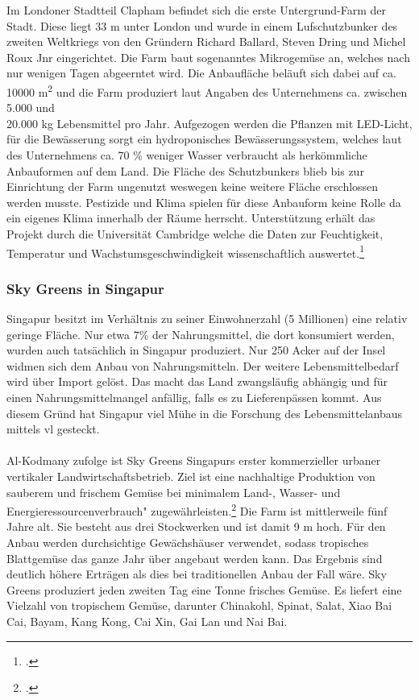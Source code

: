 \documentclass{scrartcl}
\begin{document}
Im Londoner Stadtteil Clapham befindet sich die erste Untergrund-Farm der Stadt. Diese liegt 33 m unter London und wurde in einem Lufschutzbunker des zweiten Weltkriegs von den Gründern Richard Ballard, Steven Dring und Michel Roux Jnr eingerichtet. Die Farm baut sogenanntes Mikrogemüse an, welches nach nur wenigen Tagen abgeerntet wird. Die Anbaufläche beläuft sich dabei auf ca. \\10000 m\textsuperscript{2} und die Farm produziert laut Angaben des Unternehmens ca. zwischen \\5.000 und \\20.000 kg Lebensmittel pro Jahr. Aufgezogen werden die Pflanzen mit LED-Licht, für die Bewässerung sorgt ein hydroponisches Bewässerungssystem, welches laut des Unternehmens ca. 70 \% weniger Wasser verbraucht als herkömmliche Anbauformen auf dem Land. Die Fläche des Schutzbunkers blieb bis zur Einrichtung der Farm ungenutzt weswegen keine weitere Fläche erschlossen werden musste. Pestizide und Klima spielen für diese Anbauform keine Rolle da ein eigenes Klima innerhalb der Räume herrscht. Unterstützung erhält das Projekt durch die Universität Cambridge welche die Daten zur Feuchtigkeit, Temperatur und Wachstumsgeschwindigkeit wissenschaftlich auswertet.\footcites[Vgl.]{Lepies2015AusTisch}{Steiniger2015GrowingKam}{2017GrowingLuftschutzbunker}

\subsubsection{Sky Greens in Singapur}

Singapur besitzt im Verhältnis zu seiner Einwohnerzahl (5 Millionen) eine relativ geringe Fläche.
Nur etwa 7\% der Nahrungsmittel, die dort konsumiert werden, wurden auch tatsächlich in Singapur produziert. Nur 250 Acker auf der Insel widmen sich dem Anbau von Nahrungsmitteln. Der weitere Lebensmittelbedarf wird über Import gelöst. Das macht das Land zwangsläufig abhängig und für einen Nahrungsmittelmangel anfällig, falls es zu Lieferenpässen kommt. Aus diesem Gründ hat Singapur viel Mühe in die Forschung des Lebensmittelanbaus mittels \acs{vl} gesteckt.\\ 
\\
Al-Kodmany zufolge ist Sky Greens Singapurs erster kommerzieller urbaner vertikaler Landwirtschaftsbetrieb. Ziel ist eine nachhaltige Produktion von sauberem und frischem Gemüse bei minimalem Land-, Wasser- und Energieressourcenverbrauch" zugewährleisten.\footcite{SkyGreens} Die Farm ist mittlerweile fünf Jahre alt. Sie besteht aus drei Stockwerken und ist damit 9 m hoch. Für den Anbau werden durchsichtige Gewächshäuser verwendet, sodass tropisches Blattgemüse das ganze Jahr über angebaut werden kann. Das Ergebnis sind deutlich höhere Erträgen als dies bei traditionellen Anbau der Fall wäre. Sky Greens produziert jeden zweiten Tag eine Tonne frisches Gemüse. Es liefert eine Vielzahl von tropischem Gemüse, darunter Chinakohl, Spinat, Salat, Xiao Bai Cai, Bayam, Kang Kong, Cai Xin, Gai Lan und Nai Bai. 
\end{document}

